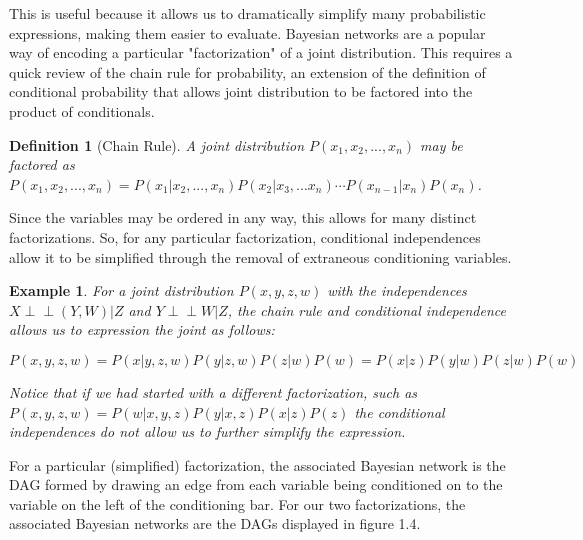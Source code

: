\documentclass[12pt,twoside]{reedthesis}
\newtheorem{example}{Example}
\newtheorem{definition}{Definition}[section]
\theoremstyle{definition}
\newcommand{\dsep}{\perp \!\!\!\perp}
\begin{document}
 This is useful because it allows us to dramatically simplify many probabilistic expressions, making them easier to evaluate. Bayesian networks  are a popular way of encoding a particular "factorization" of a joint distribution. This requires a quick review of the chain rule for probability, an extension of the definition of conditional probability that allows joint distribution to be factored into the product of conditionals. 

\begin{definition}[Chain Rule]
A joint distribution $P(x_1, x_2, ..., x_n)$ may be factored as $P(x_1, x_2, ..., x_n) = P(x_1 | x_2, ... , x_n) P(x_2  | x_3, ... x_n) \cdots P(x_{n-1} | x_n) P(x_n)$. 
\end{definition}

Since the variables may be ordered in any way, this allows for many distinct factorizations. So, for any particular factorization, conditional independences allow it to be simplified through the removal of extraneous conditioning variables. 

\begin{example}
For a joint distribution $P(x,y,z,w)$ with the independences $X \dsep (Y,W) | Z$ and $Y \dsep W | Z$, the chain rule and conditional independence allows us to expression the joint as follows:

$$P(x,y,z,w) = P(x | y,z,w)P(y | z,w) P(z | w) P(w) = P(x | z)P(y | w)P(z | w) P(w)$$

Notice that if we had started with a different factorization, such as $P(x, y, z, w) = P(w | x, y, z) P(y | x, z) P(x | z)P(z)$ the conditional independences do not allow us to further simplify the expression. 
\end{example}

For a particular (simplified) factorization, the associated Bayesian network is the DAG formed by drawing an edge from each variable being conditioned on to the variable on the left of the conditioning bar. For our two factorizations, the associated Bayesian networks are the DAGs displayed in figure 1.4.
\end{document}
